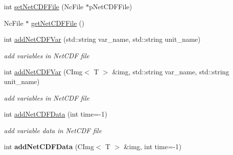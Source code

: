 \begin{DoxyCompactItemize}
\item 
int \hyperlink{classCImgNetCDF_a8b20f921fe15b013c7b16a21d244bad7}{setNetCDFFile} (NcFile $\ast$pNetCDFFile)
\item 
NcFile $\ast$ \hyperlink{classCImgNetCDF_a658c9f9281a4a20cab568cf522ed197c}{getNetCDFFile} ()
\item 
int \hyperlink{classCImgNetCDF_abae347b1449a8e6f65188ace2df5fee6}{addNetCDFVar} (std::string var\_\-name, std::string unit\_\-name)
\begin{DoxyCompactList}\small\item\em add variables in NetCDF file \item\end{DoxyCompactList}\item 
int \hyperlink{classCImgNetCDF_a7435177fdb9af36ffc8f91460427f2eb}{addNetCDFVar} (CImg$<$ T $>$ \&img, std::string var\_\-name, std::string unit\_\-name)
\begin{DoxyCompactList}\small\item\em add variables in NetCDF file \item\end{DoxyCompactList}\item 
int \hyperlink{classCImgNetCDF_a7399534c2d1d77f2a8faee47e888045a}{addNetCDFData} (int time=-\/1)
\begin{DoxyCompactList}\small\item\em add variable data in NetCDF file \item\end{DoxyCompactList}\item 
\hypertarget{classCImgNetCDF_a186c10752268e29551cc24cf84bbe758}{
int {\bfseries addNetCDFData} (CImg$<$ T $>$ \&img, int time=-\/1)}
\label{classCImgNetCDF_a186c10752268e29551cc24cf84bbe758}


\end{DoxyCompactItemize}
